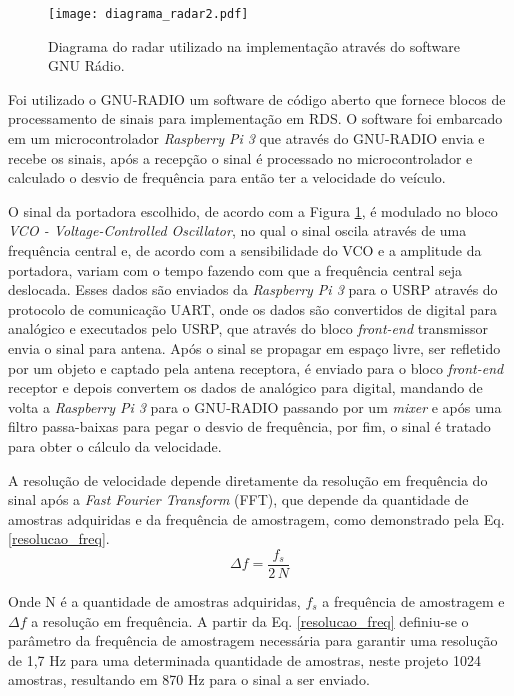\begin{figure}[H]
    \centering
    \texttt{[image: diagrama\_radar2.pdf]}
    \caption{Diagrama do radar utilizado na implementação através do software GNU Rádio.}
    \label{processos_geral_radar}
\end{figure}

Foi utilizado o GNU-RADIO um software de código aberto que fornece blocos de processamento de sinais para implementação em RDS. O software foi embarcado em um microcontrolador \emph{Raspberry Pi 3} que através do GNU-RADIO envia e recebe os sinais, após a recepção o sinal é processado no microcontrolador e calculado o desvio de frequência para então ter a velocidade do veículo. 


O sinal da portadora escolhido, de acordo com a Figura \ref{processos_geral_radar}, é modulado no bloco \emph{VCO - Voltage-Controlled Oscillator}, no qual o sinal oscila através de uma frequência central e, de acordo com a sensibilidade do VCO e a amplitude da portadora, variam com o tempo fazendo com que a frequência central seja deslocada. Esses dados são enviados da \emph{Raspberry Pi 3} para o USRP através do protocolo de comunicação UART, onde os dados são convertidos de digital para analógico e executados pelo USRP, que através do bloco \emph{front-end} transmissor envia o sinal para antena. Após o sinal se propagar em espaço livre, ser refletido por um objeto e captado pela antena receptora,  é enviado para o bloco \emph{front-end} receptor e depois convertem os dados de analógico para digital, mandando de volta a \emph{Raspberry Pi 3} para o GNU-RADIO passando por um \emph{mixer} e após uma filtro passa-baixas para pegar o desvio de frequência, por fim, o sinal é tratado para obter o cálculo da velocidade.



A resolução de velocidade depende diretamente da resolução em frequência do sinal após a \emph{Fast Fourier Transform} (FFT), que depende da quantidade de amostras adquiridas e da frequência de amostragem, como demonstrado pela Eq. \ref{resolucao_freq}.
\begin{equation}\label{resolucao_freq}
    \Delta f = \frac{f_{s}}{2\,N}
\end{equation}

Onde N é a quantidade de amostras adquiridas, $f_{s}$ a frequência de amostragem e $\Delta f$ a resolução em frequência. A partir da Eq. \ref{resolucao_freq} definiu-se o parâmetro da frequência de amostragem necessária para garantir uma resolução de 1,7 Hz para uma determinada quantidade de amostras, neste projeto 1024 amostras, resultando em 870 Hz para o sinal a ser enviado.

